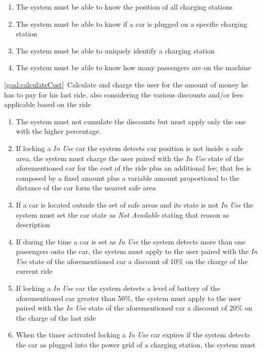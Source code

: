\begin{description}
\begin{enumerate}[resume*]
  				\item The system must be able to know the position of all charging stations
  				\item The system must be able to know if a car is plugged on a specific charging
  				station
  				\item The system must be able to uniquely identify a charging station
  				\item The system must be able to know how many passengers are on the machine	
   			\end{enumerate}
  		\item \ref{goal:calculateCost}\ Calculate and charge the user for the amount of money he
  		has to pay for his last ride, also considering the various discounts and/or fees applicable
  		based on the ride
  			\begin{enumerate}[resume*]
  			    \item The system must not cumulate the discounts but must apply only
  			    the one with the higher percentage.
  				\item If locking a \emph{In Use} car the system detects car position is not inside a
  				safe area, the system must charge the user paired with the \emph{In Use} state of the
  				aforementioned car for the cost of the ride plus an additional fee; that fee is composed
  				by a fixed amount plus a variable amount proportional to the distance of the car form
  				the nearest safe area
  				\item If a car is located outside the set of safe areas and its state is not \emph{In Use}
  				the system must set the car state as \emph{Not Available}  stating that reason as
  				description
  				\item If during the time a car is set as \emph{In Use} the system detects more than
  				one passengers onto the car, the system must apply to the user paired with the
  				\emph{In Use} state of the aforementioned car a discount of 10\% on the charge of
  				the current ride
  				\item If locking  a \emph{In Use} car the system detects a level of battery of the
  				aforementioned car greater than 50\%, the system must apply to the user paired with
  				the \emph{In Use} state of the aforementioned car a discount of 20\% on the charge
  				of the last ride
  				\item When the timer activated locking a \emph{In Use} car expires if the system
  				detects the car as plugged into the power grid of a charging station, the system must

\end{enumerate}
\end{description}
